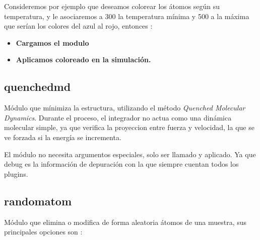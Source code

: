Consideremos por ejemplo que deseamos colorear los \'atomos seg\'un su temperatura, y le asociaremos a 300 la temperatura m\'inima y 500 a la m\'axima que ser\'ian los colores del azul al rojo, entonces :

\begin{itemize}
 \item \textbf{Cargamos el modulo}
 \item \textbf{Aplicamos coloreado en la simulaci\'on.}
\end{itemize}

\subsection{quenchedmd}
M\'odulo que m\'inimiza la estructura, utilizando el m\'etodo \textit{Quenched Molecular Dynamics}. Durante el proceso, el integrador no actua como una din\'amica molecular simple, ya que verifica la proyeccion entre fuerza y velocidad, la que se ve forzada si la energ\'ia se incrementa.


El m\'odulo no necesita argumentos especiales, solo ser llamado y aplicado. Ya que debug es la informaci\'on de depuraci\'on con la que siempre cuentan todos los plugins.

\subsection{randomatom}
M\'odulo que elimina o modifica de forma aleatoria \'atomos de una muestra, sus principales opciones son : 


